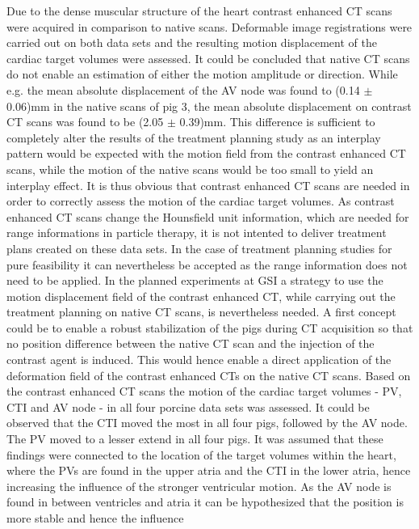 \documentclass[type=dr, dr=rernat, accentcolor=tud7b,colorbacktitle, bigchapter, openright, twoside, 12pt ]{tudthesis}
\begin{document}
Due to the dense muscular structure of the heart contrast enhanced CT scans were acquired in comparison to native scans. Deformable image 
registrations were carried out on both data sets and the resulting motion displacement of the cardiac target volumes were assessed. It 
could be concluded that native CT scans do not enable an estimation of either the motion amplitude or direction. While e.g. the mean absolute displacement 
of the AV node was found to (0.14 $\pm$ 0.06)mm in the native scans of pig 3, the mean absolute displacement on contrast CT scans was found to 
be (2.05 $\pm$ 0.39)mm. This difference is sufficient to completely alter the results of the treatment planning study as
an interplay pattern would be expected with the motion field from the contrast enhanced CT scans, while the motion of the native scans would 
be too small to yield an interplay effect. 
It is thus obvious that contrast enhanced CT scans are needed in order to correctly assess the motion of the cardiac target volumes. 
As contrast enhanced CT scans change the Hounsfield unit information, which are needed for range informations in particle therapy, it is 
not intented to deliver treatment plans created on these data sets. In the case of treatment planning studies for pure feasibility  
it can nevertheless be accepted as the range information does not need to be applied. In the planned experiments at GSI a strategy to use 
the motion displacement field of the contrast enhanced CT, while carrying out the treatment planning on native CT scans, is nevertheless needed. 
A first concept could be to enable a robust stabilization of the pigs during CT acquisition so that no position difference between the native 
CT scan and the injection of the contrast agent is induced. This would hence enable a direct application of the 
deformation field of the contrast enhanced CTs on the native CT scans.\newline
\newline
Based on the contrast enhanced CT scans the motion of the cardiac target volumes - PV, CTI and AV node - in all four porcine 
data sets was assessed. It could be observed that the CTI moved the most in all four pigs, followed by the AV node. The PV moved to a lesser 
extend in all four pigs. It was assumed that these findings were connected to the location of the target volumes within the heart, where 
the PVs are found in the upper atria and the CTI in the lower atria, hence increasing the influence of the stronger ventricular motion. 
As the AV node is found in between ventricles and atria it can be hypothesized that the position is more stable and hence the influence 
\end{document}
